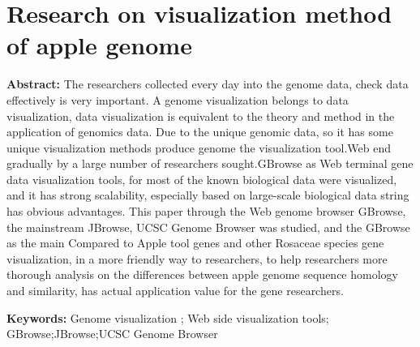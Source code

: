 \thispagestyle{empty}
\chapter*{Research on visualization method of apple genome}

\vspace{1em}

\textbf {\large Abstract: }\normalsize{The researchers collected every day into the genome data, check data effectively is very important. A genome visualization belongs to data visualization, data visualization is equivalent to the theory and method in the application of genomics data. Due to the unique genomic data, so it has some unique visualization methods produce genome the visualization tool.Web end gradually by a large number of researchers sought.GBrowse as Web terminal gene data visualization tools, for most of the known biological data were visualized, and it has strong scalability, especially based on large-scale biological data string has obvious advantages. This paper through the Web genome browser GBrowse, the mainstream JBrowse, UCSC Genome Browser was studied, and the GBrowse as the main Compared to Apple tool genes and other Rosaceae species gene visualization, in a more friendly way to researchers, to help researchers more thorough analysis on the differences between apple genome sequence homology and similarity, has actual application value for the gene researchers.}

\textbf{\large Keywords: }\normalsize{Genome visualization ; Web side visualization tools; GBrowse;JBrowse;UCSC Genome Browser}
\thispagestyle{empty}
